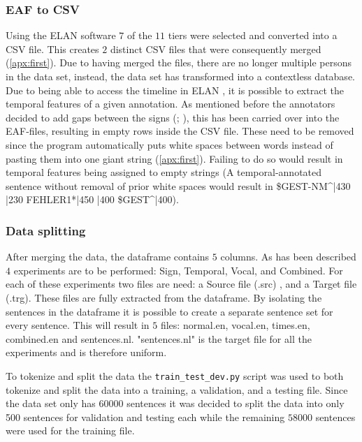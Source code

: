 \subsubsection{EAF to CSV}
Using the ELAN software $7$ of the $11$ tiers were selected and converted into a CSV file. This creates $2$ distinct CSV files that were consequently merged (\autoref{apx:first}). Due to having merged the files, there are no longer multiple persons in the data set, instead, the data set has transformed into a contextless database. Due to being able to access the timeline in ELAN \cite{elan_software}, it is possible to extract the temporal features of a given annotation. As mentioned before the annotators decided to add gaps between the signs (\citealp{hankesegmentation}; \citealp{konradoffentliches}), this has been carried over into the EAF-files, resulting in empty rows inside the CSV file. These need to be removed since the program automatically puts white spaces between words instead of pasting them into one giant string (\autoref{apx:first}). Failing to do so would result in temporal features being assigned to empty strings (A temporal-annotated sentence without removal of prior white spaces would result in \$GEST-NM\textasciicircum|430 |230 FEHLER1*|450 |400 \$GEST\textasciicircum|400).

\subsubsection{Data splitting}

After merging the data, the dataframe contains $5$ columns. As has been described $4$ experiments are to be performed: Sign, Temporal, Vocal, and Combined. For each of these experiments two files are need: a Source file (.src) , and a Target file (.trg). These files are fully extracted from the dataframe. By isolating the sentences in the dataframe it is possible to create a separate sentence set for every sentence. This will result in $5$ files: normal.en, vocal.en, times.en, combined.en and sentences.nl. "sentences.nl" is the target file for all the experiments and is therefore uniform.

To tokenize and split the data the \texttt{train\_test\_dev.py} \cite{dimitarshterionovtrain} script was used to both tokenize and split the data into a training, a validation, and a testing file. Since the data set only has $60000$ sentences it was decided to split the data into only 500 sentences for validation and testing each while the remaining $58000$ sentences were used for the training file.

